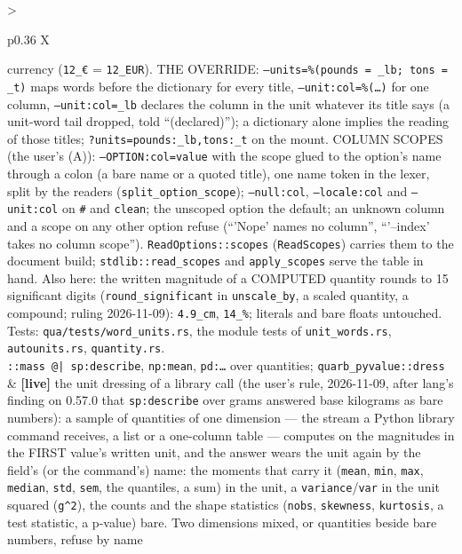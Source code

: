 \documentclass{report}
\newcommand{\live}{\textbf{\textcolor{blue!60!black}{[live]}}\xspace}
\begin{document}
\begin{xltabular}{\textwidth}{>{\raggedright\arraybackslash}p{0.36\textwidth} X}
    currency (\texttt{12\_€} = \texttt{12\_EUR}). THE OVERRIDE:
    \texttt{--units=\%(pounds = \_lb; tons = \_t)} maps words before the
    dictionary for every title, \texttt{--unit:col=\%(…)} for one
    column, \texttt{--unit:col=\_lb} declares the column in the unit
    whatever its title says (a unit-word tail dropped, told
    ``(declared)''); a dictionary alone implies the reading of those
    titles; \texttt{?units=pounds:\_lb,tons:\_t} on the mount. COLUMN
    SCOPES (the user's (A)): \texttt{--OPTION:col=value} with the scope
    glued to the option's name through a colon (a bare name or a quoted
    title), one name token in the lexer, split by the readers
    (\texttt{split\_option\_scope}); \texttt{--null:col}, \texttt{--locale:col}
    and \texttt{--unit:col} on \texttt{\#} and \texttt{clean}; the
    unscoped option the default; an unknown column and a scope on any
    other option refuse (``'Nope' names no column'', ``'--index' takes
    no column scope''). \texttt{ReadOptions::scopes} (\texttt{ReadScopes})
    carries them to the document build; \texttt{stdlib::read\_scopes}
    and \texttt{apply\_scopes} serve the table in hand. Also here: the
    written magnitude of a COMPUTED quantity rounds to 15 significant
    digits (\texttt{round\_significant} in \texttt{unscale\_by}, a scaled
    quantity, a compound; ruling 2026-11-09): \texttt{4.9\_cm}, \texttt{14\_\%};
    literals and bare floats untouched. Tests:
    \texttt{qua/tests/word\_units.rs}, the module tests of
    \texttt{unit\_words.rs}, \texttt{autounits.rs}, \texttt{quantity.rs}. \\
\texttt{::mass @| sp:describe}, \texttt{np:mean}, \texttt{pd:…} over quantities; \texttt{quarb\_pyvalue::dress}
  & \live the unit dressing of a library call (the user's rule,
    2026-11-09, after lang's finding on 0.57.0 that \texttt{sp:describe}
    over grams answered base kilograms as bare numbers): a sample of
    quantities of one dimension — the stream a Python library command
    receives, a list or a one-column table — computes on the
    magnitudes in the FIRST value's written unit, and the answer wears
    the unit again by the field's (or the command's) name: the moments
    that carry it (\texttt{mean}, \texttt{min}, \texttt{max}, \texttt{median},
    \texttt{std}, \texttt{sem}, the quantiles, a sum) in the unit, a
    \texttt{variance}/\texttt{var} in the unit squared (\texttt{g\^{}2}),
    the counts and the shape statistics (\texttt{nobs}, \texttt{skewness},
    \texttt{kurtosis}, a test statistic, a p-value) bare. Two dimensions
    mixed, or quantities beside bare numbers, refuse by name

\end{xltabular}
\end{document}
